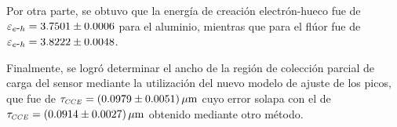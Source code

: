 Por otra parte, se obtuvo que la energía de creación electrón-hueco fue de $\varepsilon_{e\mbox{-}h} = 3.7501 \pm 0.0006$ para el aluminio, mientras que para el flúor fue de $\varepsilon_{e\mbox{-}h} = 3.8222 \pm 0.0048$.

Finalmente, se logró determinar el ancho de la región de colección parcial de carga del sensor mediante la utilización del nuevo modelo de ajuste de los picos, que fue de $\tau_{\scaleto{CCE}{4pt}} = (0.0979 \pm 0.0051)\,\si{\mu m}$ cuyo error solapa con el de $\tau_{\scaleto{CCE}{4pt}} = (0.0914 \pm 0.0027)\,\si{\mu m} $ obtenido mediante otro método\cite{PCC-CCE}.

